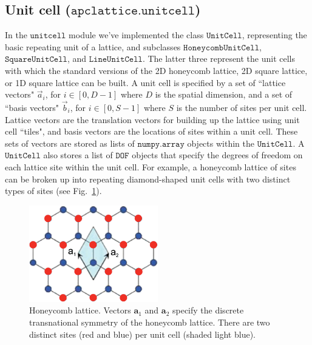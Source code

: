\documentclass{article}
\begin{document}
\subsection{Unit cell ($\texttt{apclattice.unitcell}$)}
In the $\texttt{unitcell}$ module we've implemented the class $\texttt{UnitCell}$, representing the basic repeating unit of a lattice, and subclasses $\texttt{HoneycombUnitCell}$, $\texttt{SquareUnitCell}$, and $\texttt{LineUnitCell}$. The latter three represent the unit cells with which the standard versions of the 2D honeycomb lattice, 2D square lattice, or 1D square lattice can be built. A unit cell is specified by a set of ``lattice vectors" $\vec{a}_i$, for $i\in [0, D-1]$ where $D$ is the spatial dimension, and a set of ``basis vectors" $\vec{b}_i$, for $i \in [0, S-1]$ where $S$ is the number of sites per unit cell. Lattice vectors are the translation vectors for building up the lattice using unit cell ``tiles", and basis vectors are the locations of sites within a unit cell. These sets of vectors are stored as lists of $\texttt{numpy.array}$ objects within the $\texttt{UnitCell}$. A $\texttt{UnitCell}$ also stores a list of $\texttt{DOF}$ objects that specify the degrees of freedom on each lattice site within the unit cell.  For example, a honeycomb lattice of sites can be broken up into repeating diamond-shaped unit cells with two distinct types of sites (see Fig.~\ref{fig:honeycomb}).

\begin{figure}[ht]
    \centering
    \includegraphics[width=0.5\textwidth]{honeycomb.png}
    \caption{Honeycomb lattice. Vectors $\mathbf{a}_1$ and $\mathbf{a}_2$ specify the discrete transnational symmetry of the honeycomb lattice. There are two distinct sites (red and blue) per unit cell (shaded light blue).}
    \label{fig:honeycomb}
\end{figure}
\end{document}
